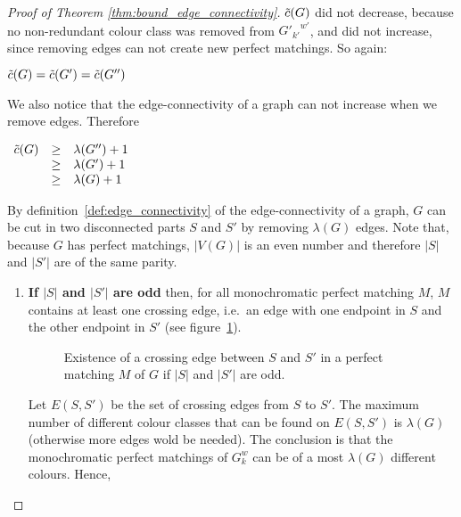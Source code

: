 \begin{proof}[Proof of Theorem \ref{thm:bound_edge_connectivity}]
    $\Tilde{c}(G)$ did not decrease, because no non-redundant colour class was removed from ${G'_{k'}}^{w'}$, and did not increase, since removing edges can not create new perfect matchings.
    So again:
    
    \begin{center}
        $\Tilde{c}(G) = \Tilde{c}(G') = \Tilde{c}(G'')$
    \end{center}
    
    We also notice that the edge-connectivity of a graph can not increase when we remove edges.
    Therefore
    
    \begin{center}
        $\begin{array}{l c l}
            \Tilde{c}(G) & \geq & \lambda(G'') + 1 \\
                         & \geq & \lambda(G') + 1 \\
                         & \geq & \lambda(G) + 1
        \end{array}$
    \end{center}
    
    By definition~\ref{def:edge_connectivity} of the edge-connectivity of a graph, $G$ can be cut in two disconnected parts $S$ and $S'$ by removing $\lambda(G)$ edges.
    Note that, because $G$ has perfect matchings, $|V(G)|$ is an even number and therefore $|S|$ and $|S'|$ are of the same parity.
    
    \begin{enumerate}
        \item 
            \textbf{If $|S|$ and $|S'|$ are odd} then, for all monochromatic perfect matching $M$, $M$ contains at least one crossing edge, i.e.\ an edge with one endpoint in $S$ and the other endpoint in $S'$ (see figure~\ref{fig:proof_lambda_odd}).
            
            \begin{figure}[H]
                \caption{Existence of a crossing edge between $S$ and $S'$ in a perfect matching $M$ of $G$ if $|S|$ and $|S'|$ are odd.}
                \label{fig:proof_lambda_odd}
            \end{figure}
            
            Let $E(S, S')$ be the set of crossing edges from $S$ to $S'$.
            The maximum number of different colour classes that can be found on $E(S, S')$ is $\lambda(G)$ (otherwise more edges wold be needed).
            The conclusion is that the monochromatic perfect matchings of $G_k^w$ can be of a most $\lambda(G)$ different colours.
            Hence,
            

\end{enumerate}
\end{proof}
